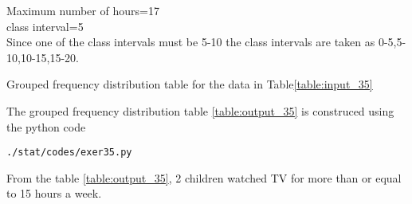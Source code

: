Maximum number of hours=17\\
class interval=5\\
Since one of the class intervals must be 5-10 the class intervals are taken as 0-5,5-10,10-15,15-20.
\begin{table}[ht!]
\centering

\caption{Grouped frequency distribution table for the data in Table\ref{table:input_35}}
\label{table:output_35}
\end{table}
The grouped frequency distribution table \ref{table:output_35} is construced using the python code
\begin{lstlisting}
./stat/codes/exer35.py
\end{lstlisting}
From the table \ref{table:output_35}, 2 children watched TV for more than or equal to 15 hours a week. 

